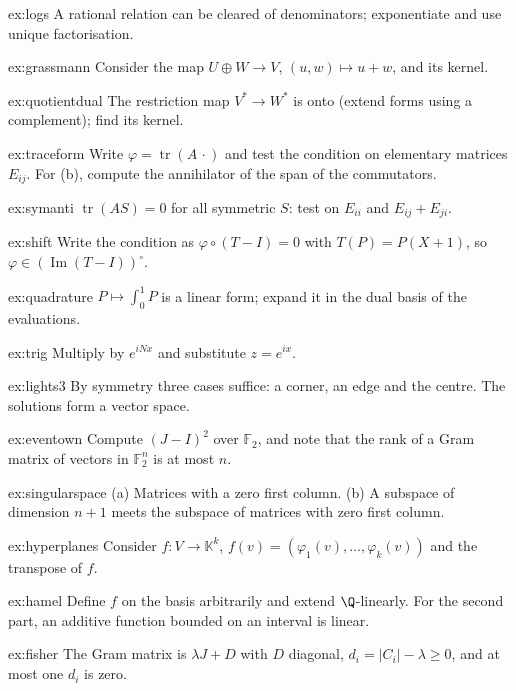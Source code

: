 \begin{hint}{ex:logs}
A rational relation can be cleared of denominators; exponentiate and use unique factorisation.
\end{hint}
\begin{hint}{ex:grassmann}
Consider the map $U\oplus W\to V$, $(u,w)\mapsto u+w$, and its kernel.
\end{hint}
\begin{hint}{ex:quotientdual}
The restriction map $V^*\to W^*$ is onto (extend forms using a complement); find its kernel.
\end{hint}
\begin{hint}{ex:traceform}
Write $\varphi=\operatorname{tr}(A\,\cdot)$ and test the condition on elementary matrices $E_{ij}$. For (b), compute the
annihilator of the span of the commutators.
\end{hint}
\begin{hint}{ex:symanti}
$\operatorname{tr}(AS)=0$ for all symmetric $S$: test on $E_{ii}$ and $E_{ij}+E_{ji}$.
\end{hint}
\begin{hint}{ex:shift}
Write the condition as $\varphi\circ(T-I)=0$ with $T(P)=P(X+1)$, so $\varphi\in(\operatorname{Im}(T-I))^\circ$.
\end{hint}
\begin{hint}{ex:quadrature}
$P\mapsto\int_0^1P$ is a linear form; expand it in the dual basis of the evaluations.
\end{hint}
\begin{hint}{ex:trig}
Multiply by $e^{iNx}$ and substitute $z=e^{ix}$.
\end{hint}
\begin{hint}{ex:lights3}
By symmetry three cases suffice: a corner, an edge and the centre. The solutions form a vector space.
\end{hint}
\begin{hint}{ex:eventown}
Compute $(J-I)^2$ over $\mathbb F_2$, and note that the rank of a Gram matrix of vectors in $\mathbb F_2^n$ is at most $n$.
\end{hint}
\begin{hint}{ex:singularspace}
(a) Matrices with a zero first column. (b) A subspace of dimension $n+1$ meets the subspace of matrices with zero first
column.
\end{hint}
\begin{hint}{ex:hyperplanes}
Consider $f:V\to\mathbb K^k$, $f(v)=(\varphi_1(v),\dots,\varphi_k(v))$ and the transpose of $f$.
\end{hint}
\begin{hint}{ex:hamel}
Define $f$ on the basis arbitrarily and extend $\Q$-linearly. For the second part, an additive function bounded on an
interval is linear.
\end{hint}
\begin{hint}{ex:fisher}
The Gram matrix is $\lambda J+D$ with $D$ diagonal, $d_i=|C_i|-\lambda\ge0$, and at most one $d_i$ is zero.
\end{hint}

